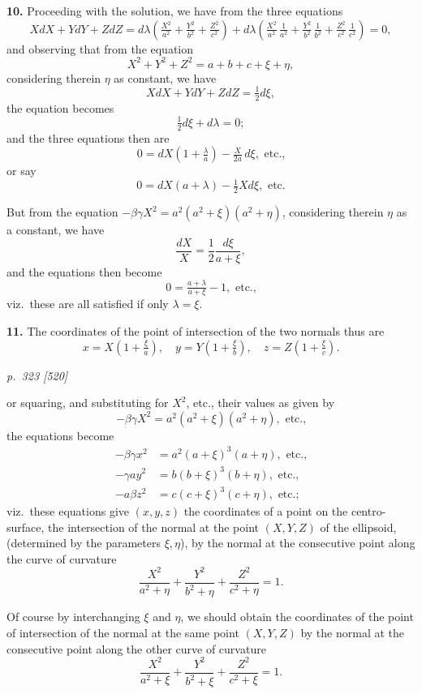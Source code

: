 \documentclass[11pt,a4paper]{book}
\begin{document}
\textbf{10.} Proceeding with the solution, we have from the three equations
\[
X dX + Y dY + Z dZ = d\lambda\!\left(\tfrac{X^2}{a^2} + \tfrac{Y^2}{b^2} + \tfrac{Z^2}{c^2}\right) + d\lambda\!\left(\tfrac{X^2}{a^2}\,\tfrac{1}{a^2} + \tfrac{Y^2}{b^2}\,\tfrac{1}{b^2} + \tfrac{Z^2}{c^2}\,\tfrac{1}{c^2}\right) = 0,
\]
and observing that from the equation
\[
X^2 + Y^2 + Z^2 = a + b + c + \xi + \eta,
\]
considering therein $\eta$ as constant, we have
\[
X dX + Y dY + Z dZ = \tfrac{1}{2}d\xi,
\]
the equation becomes
\[
\tfrac{1}{2}d\xi + d\lambda = 0;
\]
and the three equations then are
\[
0 = dX\left(1 + \tfrac{\lambda}{a}\right) - \tfrac{X}{2 a}\,d\xi, \text{ etc.,}
\]
or say
\[
0 = dX(a + \lambda) - \tfrac{1}{2}X d\xi, \text{ etc.}
\]

But from the equation $-\beta\gamma X^2 = a^2(a^2 + \xi)(a^2 + \eta)$, considering therein $\eta$ as a constant, we have
\[
\frac{dX}{X} = \frac{1}{2}\frac{d\xi}{a + \xi},
\]
and the equations then become
\[
0 = \tfrac{a + \lambda}{a + \xi} - 1, \text{ etc.,}
\]
viz.\ these are all satisfied if only $\lambda = \xi$.

\textbf{11.} The coordinates of the point of intersection of the two normals thus are
\[
x = X\left(1 + \tfrac{\xi}{a}\right),\quad y = Y\left(1 + \tfrac{\xi}{b}\right),\quad z = Z\left(1 + \tfrac{\xi}{c}\right).
\]

\clearpage

\bigskip
\textit{p.~323 [520]}
\smallskip

or squaring, and substituting for $X^2$, etc., their values as given by
\[
-\beta\gamma X^2 = a^2(a^2 + \xi)(a^2 + \eta), \text{ etc.,}
\]
the equations become
\begin{align*}
-\beta\gamma x^2 &= a^2(a + \xi)^3(a + \eta), \text{ etc.,}\\
-\gamma a y^2 &= b(b + \xi)^3(b + \eta), \text{ etc.,}\\
-a\beta z^2 &= c(c + \xi)^3(c + \eta), \text{ etc.;}
\end{align*}
viz.\ these equations give $(x, y, z)$ the coordinates of a point on the centro-surface, the intersection of the normal at the point $(X, Y, Z)$ of the ellipsoid, (determined by the parameters $\xi, \eta$), by the normal at the consecutive point along the curve of curvature
\[
\frac{X^2}{a^2 + \eta} + \frac{Y^2}{b^2 + \eta} + \frac{Z^2}{c^2 + \eta} = 1.
\]

Of course by interchanging $\xi$ and $\eta$, we should obtain the coordinates of the point of intersection of the normal at the same point $(X, Y, Z)$ by the normal at the consecutive point along the other curve of curvature
\[
\frac{X^2}{a^2 + \xi} + \frac{Y^2}{b^2 + \xi} + \frac{Z^2}{c^2 + \xi} = 1.
\]
\end{document}
